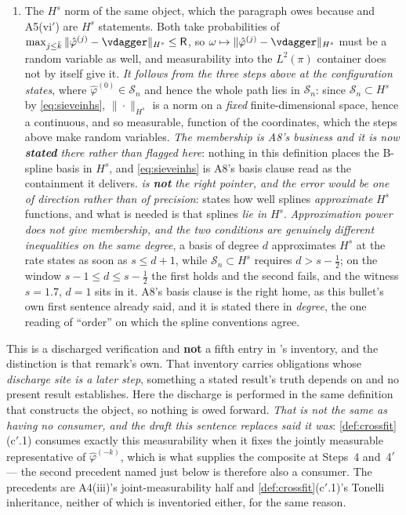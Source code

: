 \begin{enumerate}
\item[--] The $H^{s}$ norm of the same object, which the paragraph owes because  and
A5(vi$'$) are $H^{s}$ statements. Both take probabilities of
$\max_{j\le\bar k}\|\hat\varphi^{(j)}-\vdagger\|_{H^{s}}\le\mathsf R$, so
$\omega\mapsto\|\hat\varphi^{(j)}-\vdagger\|_{H^{s}}$ must be a random variable as well, and measurability
into the $L^{2}(\pi)$ container does not by itself give it. \emph{It follows from the three steps above at the
configuration  states}, where $\hat\varphi^{(0)}\in\mathcal S_n$ and hence the whole path
lies in $\mathcal S_n$: since $\mathcal S_n\subset H^{s}$ by \eqref{eq:sieveinhs}, $\|\cdot\|_{H^{s}}$ is a
norm on a \emph{fixed} finite-dimensional space, hence a continuous, and so measurable, function of the
coordinates, which the steps above make random variables. \emph{The membership is A8's business and it is now
\textbf{stated} there rather than flagged here}: nothing in this definition places the B-spline basis in
$H^{s}$, and \eqref{eq:sieveinhs} is A8's basis clause read as the containment it delivers.
\emph{ is \textbf{not} the right pointer, and the error would be one of direction
rather than of precision}:  states how well splines \emph{approximate}
$H^{s}$ functions, and what is needed is that splines \emph{lie in} $H^{s}$. \emph{Approximation power does
not give membership, and the two conditions are genuinely different inequalities on the same degree}, a
basis of degree $d$ approximates $H^{s}$ at the rate  states as soon as $s\le d+1$, while
$\mathcal S_n\subset H^{s}$ requires $d>s-\tfrac12$; on the window $s-1\le d\le s-\tfrac12$ the first holds
and the second fails, and the witness $s=1.7$, $d=1$ sits in it. A8's basis clause is the
right home, as this bullet's own first sentence already said, and it is stated there in \emph{degree}, the
one reading of ``order'' on which the spline conventions agree.
\end{enumerate}
This is a discharged verification and \textbf{not} a fifth entry in 's inventory,
and the distinction is that remark's own. That inventory carries obligations whose \emph{discharge site is a
later step}, something a stated result's truth depends on and no present result establishes. Here the
discharge is performed in the same definition that constructs the object, so nothing is owed forward.
\emph{That is not the same as having no consumer, and the draft this sentence replaces said it
was}: \cref{def:crossfit}\textup{(c$'$.1)} consumes exactly this measurability when it fixes the
jointly measurable representative of $\hat\varphi^{(-k)}$, which is what supplies the composite at
 Steps~4 and~4$'$ --- the second precedent named just below is therefore
also a consumer. The precedents are A4(iii)'s joint-measurability half and
\cref{def:crossfit}\textup{(c$'$.1)}'s Tonelli inheritance, neither of which is inventoried either, for the
same reason.

